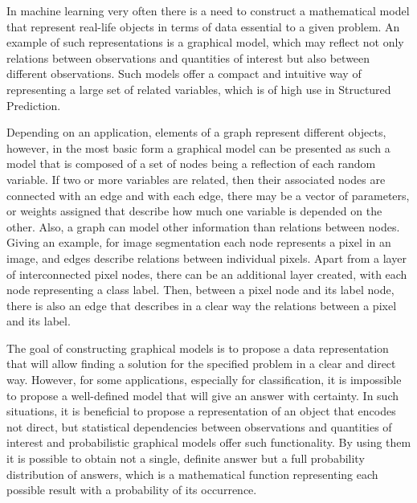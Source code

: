 In machine learning very often there is a need to construct a mathematical model that represent real-life objects in terms of data essential to a given problem. An example of such representations is a graphical model, which may reflect not only relations between observations and quantities of interest but also between different observations. Such models offer a compact and intuitive way of representing a large set of related variables, which is of high use in Structured Prediction. 

Depending on an application, elements of a graph represent different objects, however, in the most basic form a graphical model can be presented as such a model that is composed of a set of nodes being a reflection of each random variable. If two or more variables are related, then their associated nodes are connected with an edge and with each edge, there may be a vector of parameters, or weights assigned that describe how much one variable is depended on the other. Also, a graph can model other information than relations between nodes. Giving an example, for image segmentation each node represents a pixel in an image, and edges describe relations between individual pixels. Apart from a layer of interconnected pixel nodes, there can be an additional layer created, with each node representing a class label. Then, between a pixel node and its label node, there is also an edge that describes in a clear way the relations between a pixel and its label.

The goal of constructing graphical models is to propose a data representation that will allow finding a solution for the specified problem in a clear and direct way. However, for some applications, especially for classification, it is impossible to propose a well-defined model that will give an answer with certainty. In such situations, it is beneficial to propose a representation of an object that encodes not direct, but statistical dependencies between observations and quantities of interest and probabilistic graphical models offer such functionality. By using them it is possible to obtain not a single, definite answer but a full probability distribution of answers, which is a mathematical function representing each possible result with a probability of its occurrence. 

